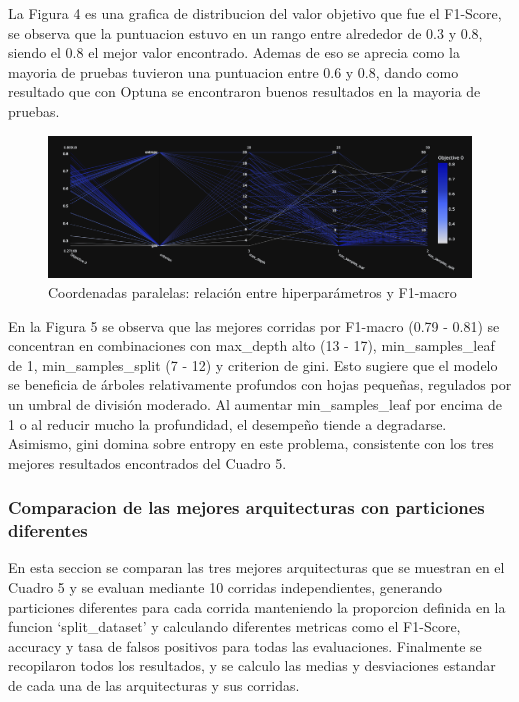\documentclass[12pt,a4paper]{article}
\begin{document}
La Figura 4 es una grafica de distribucion del valor objetivo que fue el F1-Score, se observa que
la puntuacion estuvo en un rango entre alrededor de 0.3 y 0.8, siendo el 0.8 el mejor valor encontrado.
Ademas de eso se aprecia como la mayoria de pruebas tuvieron una puntuacion entre 0.6 y 0.8,
dando como resultado que con Optuna se encontraron buenos resultados en la mayoria de pruebas.

\begin{figure}[H]
  \centering
  \includegraphics[width=1\textwidth]{../img/ParallelDecisionTree.png}
  \caption{Coordenadas paralelas: relación entre hiperparámetros y F1-macro}\label{fig:parallel-decision-tree}
\end{figure}

En la Figura 5 se observa que las mejores corridas por F1-macro (0.79 - 0.81)
se concentran en combinaciones con max_depth alto (13 - 17), min_samples_leaf de 1, min_samples_split (7 - 12)
y criterion de gini. Esto sugiere que el modelo se beneficia de árboles relativamente profundos con hojas pequeñas,
regulados por un umbral de división moderado. Al aumentar min_samples_leaf por encima de 1 o al reducir mucho la profundidad,
el desempeño tiende a degradarse. Asimismo, gini domina sobre entropy en este problema,
consistente con los tres mejores resultados encontrados del Cuadro 5.

\subsubsection{Comparacion de las mejores arquitecturas con particiones diferentes}

En esta seccion se comparan las tres mejores arquitecturas que se muestran en el Cuadro 5 y se evaluan
mediante 10 corridas independientes, generando particiones diferentes para cada corrida manteniendo la
proporcion definida en la funcion `split_dataset' y calculando diferentes metricas
como el F1-Score, accuracy y tasa de falsos positivos para todas las evaluaciones.
Finalmente se recopilaron todos los resultados, y se calculo las medias
y desviaciones estandar de cada una de las arquitecturas y sus corridas.
\end{document}
